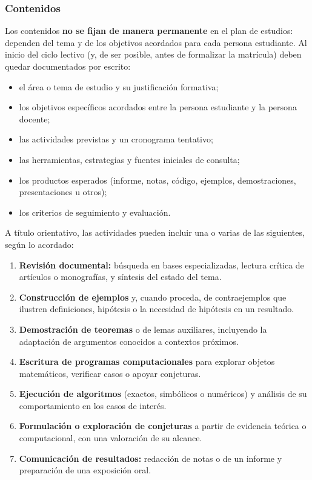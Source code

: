 \begin{refsection}
\subsubsection*{Contenidos}

Los contenidos \textbf{no se fijan de manera permanente} en el plan de estudios: dependen del tema y de los objetivos acordados para cada persona estudiante. Al inicio del ciclo lectivo (y, de ser posible, antes de formalizar la matrícula) deben quedar documentados por escrito:

\begin{itemize}
\item el área o tema de estudio y su justificación formativa;
\item los objetivos específicos acordados entre la persona estudiante y la persona docente;
\item las actividades previstas y un cronograma tentativo;
\item las herramientas, estrategias y fuentes iniciales de consulta;
\item los productos esperados (informe, notas, código, ejemplos, demostraciones, presentaciones u otros);
\item los criterios de seguimiento y evaluación.
\end{itemize}

A título orientativo, las actividades pueden incluir una o varias de las siguientes, según lo acordado:

\begin{enumerate}
\item \textbf{Revisión documental:} búsqueda en bases especializadas, lectura crítica de artículos o monografías, y síntesis del estado del tema.
\item \textbf{Construcción de ejemplos} y, cuando proceda, de contraejemplos que ilustren definiciones, hipótesis o la necesidad de hipótesis en un resultado.
\item \textbf{Demostración de teoremas} o de lemas auxiliares, incluyendo la adaptación de argumentos conocidos a contextos próximos.
\item \textbf{Escritura de programas computacionales} para explorar objetos matemáticos, verificar casos o apoyar conjeturas.
\item \textbf{Ejecución de algoritmos} (exactos, simbólicos o numéricos) y análisis de su comportamiento en los casos de interés.
\item \textbf{Formulación o exploración de conjeturas} a partir de evidencia teórica o computacional, con una valoración de su alcance.
\item \textbf{Comunicación de resultados:} redacción de notas o de un informe y preparación de una exposición oral.
\end{enumerate}


\end{refsection}
